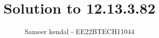 \documentclass[journal,12pt,onecolumn]{IEEEtran}
\theoremstyle{remark}
\begin{document}
%




\vspace{3cm}

\title{Solution to 12.13.3.82}
\author{Sameer kendal - EE22BTECH11044}
	
	


%
%
%

% 
%



% 
\end{document}
